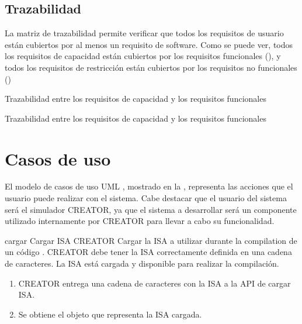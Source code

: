 \FloatBarrier


\subsection{Trazabilidad}\label{subsec:trazability}

La matriz de trazabilidad permite verificar que todos los requisitos de usuario
están cubiertos por al menos un requisito de software. Como se puede ver, todos
los requisitos de capacidad están cubiertos por los requisitos funcionales
(), y todos los requisitos de restricción están
cubiertos por los requisitos no funcionales ()

    {Trazabilidad entre los requisitos de capacidad y los requisitos funcionales}

    {Trazabilidad entre los requisitos de capacidad y los requisitos funcionales}

\FloatBarrier

\section{Casos de uso}\label{sec:usecases}

El modelo de casos de uso UML \parencite{UMLSpec}, mostrado en la
, representa las acciones que el usuario puede realizar con
el sistema. Cabe destacar que el usuario del sistema será el simulador CREATOR,
ya que el sistema a desarrollar será un componente utilizado internamente por
CREATOR para llevar a cabo su funcionalidad.


\printuctemplate

\begin{useCase}{cargar}
    {Cargar \gls{ISA}} %
    {CREATOR} %
    {Cargar la \gls{ISA} a utilizar durante la \gls{compilation} de un código .} %
    {CREATOR debe tener la \gls{ISA} correctamente definida en una cadena de caracteres.} %
    {La \gls{ISA} está cargada y disponible para realizar la compilación.} %
    \begin{enumerate}[leftmargin=*, topsep=0pt, noitemsep]
        \item CREATOR entrega una cadena de caracteres con la
        \gls{ISA} a la \gls{API} de cargar \gls{ISA}.
        \item Se obtiene el objeto que representa la \gls{ISA} cargada.
    \end{enumerate}
\end{useCase}


